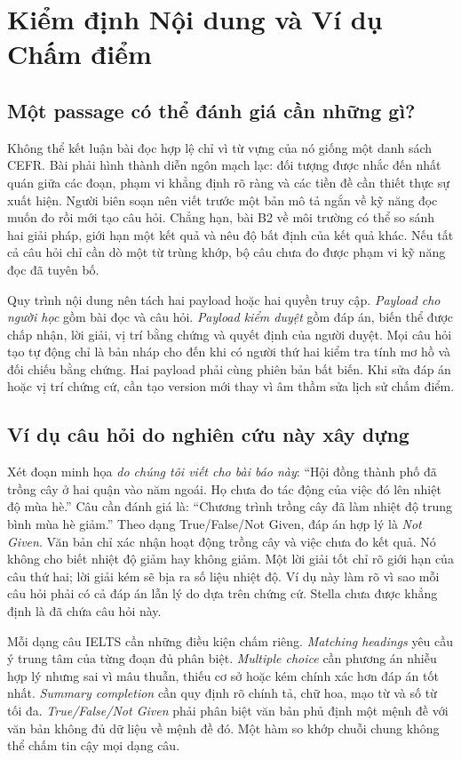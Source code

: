 \documentclass[conference,10pt]{IEEEtran}
\begin{document}
\section{Kiểm định Nội dung và Ví dụ Chấm điểm}
\subsection{Một passage có thể đánh giá cần những gì?}
Không thể kết luận bài đọc hợp lệ chỉ vì từ vựng của nó giống một danh sách CEFR. Bài phải hình thành diễn ngôn mạch lạc: đối tượng được nhắc đến nhất quán giữa các đoạn, phạm vi khẳng định rõ ràng và các tiền đề cần thiết thực sự xuất hiện. Người biên soạn nên viết trước một bản mô tả ngắn về kỹ năng đọc muốn đo rồi mới tạo câu hỏi. Chẳng hạn, bài B2 về môi trường có thể so sánh hai giải pháp, giới hạn một kết quả và nêu độ bất định của kết quả khác. Nếu tất cả câu hỏi chỉ cần dò một từ trùng khớp, bộ câu chưa đo được phạm vi kỹ năng đọc đã tuyên bố.

Quy trình nội dung nên tách hai payload hoặc hai quyền truy cập. \emph{Payload cho người học} gồm bài đọc và câu hỏi. \emph{Payload kiểm duyệt} gồm đáp án, biến thể được chấp nhận, lời giải, vị trí bằng chứng và quyết định của người duyệt. Mọi câu hỏi tạo tự động chỉ là bản nháp cho đến khi có người thứ hai kiểm tra tính mơ hồ và đối chiếu bằng chứng. Hai payload phải cùng phiên bản bất biến. Khi sửa đáp án hoặc vị trí chứng cứ, cần tạo version mới thay vì âm thầm sửa lịch sử chấm điểm.

\subsection{Ví dụ câu hỏi do nghiên cứu này xây dựng}
Xét đoạn minh họa \emph{do chúng tôi viết cho bài báo này}: ``Hội đồng thành phố đã trồng cây ở hai quận vào năm ngoái. Họ chưa đo tác động của việc đó lên nhiệt độ mùa hè.'' Câu cần đánh giá là: ``Chương trình trồng cây đã làm nhiệt độ trung bình mùa hè giảm.'' Theo dạng True/False/Not Given, đáp án hợp lý là \emph{Not Given}. Văn bản chỉ xác nhận hoạt động trồng cây và việc chưa đo kết quả. Nó không cho biết nhiệt độ giảm hay không giảm. Một lời giải tốt chỉ rõ giới hạn của câu thứ hai; lời giải kém sẽ bịa ra số liệu nhiệt độ. Ví dụ này làm rõ vì sao mỗi câu hỏi phải có cả đáp án lẫn lý do dựa trên chứng cứ. Stella chưa được khẳng định là đã chứa câu hỏi này.

Mỗi dạng câu IELTS cần những điều kiện chấm riêng. \emph{Matching headings} yêu cầu ý trung tâm của từng đoạn đủ phân biệt. \emph{Multiple choice} cần phương án nhiễu hợp lý nhưng sai vì mâu thuẫn, thiếu cơ sở hoặc kém chính xác hơn đáp án tốt nhất. \emph{Summary completion} cần quy định rõ chính tả, chữ hoa, mạo từ và số từ tối đa. \emph{True/False/Not Given} phải phân biệt văn bản phủ định một mệnh đề với văn bản không đủ dữ liệu về mệnh đề đó. Một hàm so khớp chuỗi chung không thể chấm tin cậy mọi dạng câu.
\end{document}
